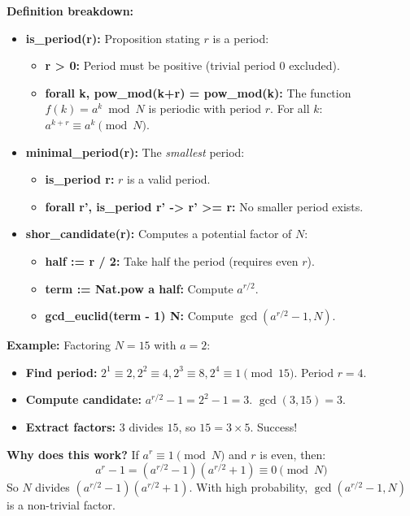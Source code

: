 \textbf{Definition breakdown:}
\begin{itemize}
    \item \textbf{is\_period(r):} Proposition stating $r$ is a period:
    \begin{itemize}
        \item \textbf{r > 0:} Period must be positive (trivial period 0 excluded).
        \item \textbf{forall k, pow\_mod(k+r) = pow\_mod(k):} The function $f(k) = a^k \bmod N$ is periodic with period $r$. For all $k$: $a^{k+r} \equiv a^k \pmod{N}$.
    \end{itemize}
    
    \item \textbf{minimal\_period(r):} The \textit{smallest} period:
    \begin{itemize}
        \item \textbf{is\_period r:} $r$ is a valid period.
        \item \textbf{forall r', is\_period r' -> r' >= r:} No smaller period exists.
    \end{itemize}
    
    \item \textbf{shor\_candidate(r):} Computes a potential factor of $N$:
    \begin{itemize}
        \item \textbf{half := r / 2:} Take half the period (requires even $r$).
        \item \textbf{term := Nat.pow a half:} Compute $a^{r/2}$.
        \item \textbf{gcd\_euclid(term - 1) N:} Compute $\gcd(a^{r/2} - 1, N)$.
    \end{itemize}
\end{itemize}

\textbf{Example:} Factoring $N = 15$ with $a = 2$:
\begin{itemize}
    \item \textbf{Find period:} $2^1 \equiv 2, 2^2 \equiv 4, 2^3 \equiv 8, 2^4 \equiv 1 \pmod{15}$. Period $r = 4$.
    \item \textbf{Compute candidate:} $a^{r/2} - 1 = 2^2 - 1 = 3$. $\gcd(3, 15) = 3$.
    \item \textbf{Extract factors:} $3$ divides $15$, so $15 = 3 \times 5$. Success!
\end{itemize}

\textbf{Why does this work?} If $a^r \equiv 1 \pmod{N}$ and $r$ is even, then:
\[
a^r - 1 = (a^{r/2} - 1)(a^{r/2} + 1) \equiv 0 \pmod{N}
\]
So $N$ divides $(a^{r/2} - 1)(a^{r/2} + 1)$. With high probability, $\gcd(a^{r/2} - 1, N)$ is a non-trivial factor.

